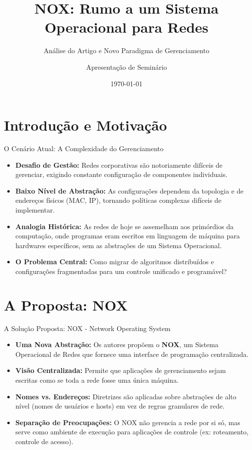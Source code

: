 \documentclass[aspectratio=169,xcolor=dvipsnames]{beamer}
\title{NOX: Rumo a um Sistema Operacional para Redes}
\subtitle{Análise do Artigo e Novo Paradigma de Gerenciamento}
\author{Apresentação de Seminário}
\institute{Programa de Pós-Graduação}
\date{\today}
\begin{document}
\begin{frame}[plain]
    \titlepage
\end{frame}

\section{Introdução e Motivação}

\begin{frame}{O Cenário Atual: A Complexidade do Gerenciamento}
    \begin{itemize}
        \item \textbf{Desafio de Gestão:} Redes corporativas são notoriamente difíceis de gerenciar, exigindo constante configuração de componentes individuais.
        \item \textbf{Baixo Nível de Abstração:} As configurações dependem da topologia e de endereços físicos (MAC, IP), tornando políticas complexas difíceis de implementar.
        \item \textbf{Analogia Histórica:} As redes de hoje se assemelham aos primórdios da computação, onde programas eram escritos em linguagem de máquina para hardwares específicos, sem as abstrações de um Sistema Operacional.
        \item \textbf{O Problema Central:} Como migrar de algoritmos distribuídos e configurações fragmentadas para um controle unificado e programável?
    \end{itemize}
\end{frame}

\section{A Proposta: NOX}

\begin{frame}{A Solução Proposta: NOX - Network Operating System}
    \begin{itemize}
        \item \textbf{Uma Nova Abstração:} Os autores propõem o \textbf{NOX}, um Sistema Operacional de Redes que fornece uma interface de programação centralizada.
        \item \textbf{Visão Centralizada:} Permite que aplicações de gerenciamento sejam escritas como se toda a rede fosse uma única máquina.
        \item \textbf{Nomes vs. Endereços:} Diretrizes são aplicadas sobre abstrações de alto nível (nomes de usuários e hosts) em vez de regras granulares de rede.
        \item \textbf{Separação de Preocupações:} O NOX não gerencia a rede por si só, mas serve como ambiente de execução para aplicações de controle (ex: roteamento, controle de acesso).
    \end{itemize}
\end{frame}
\end{document}
